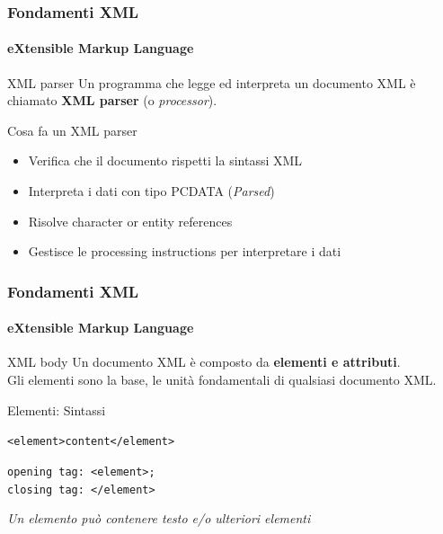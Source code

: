 \begin{frame}
	\frametitle{Fondamenti XML}
	\framesubtitle{eXtensible Markup Language}
	\addtocounter{nframe}{1}

	\begin{block}{XML parser}
		Un programma che legge ed interpreta un documento XML è chiamato \textbf{XML parser} (o \textit{processor}).
	\end{block}
	\begin{block}{Cosa fa un XML parser}
		\begin{itemize}
			\item Verifica che il documento rispetti la sintassi XML
			\item Interpreta i dati con tipo PCDATA (\textit{Parsed})
			\item Risolve character or entity references
			\item Gestisce le processing instructions per interpretare i dati
		\end{itemize}
	\end{block}

\end{frame}





\begin{frame}
    \frametitle{Fondamenti XML}
    \framesubtitle{eXtensible Markup Language}
    \addtocounter{nframe}{1}

	\begin{block}{XML body}
		Un documento XML è composto da \textbf{elementi e attributi}. 
	   \\ Gli elementi sono la base, le unità fondamentali di qualsiasi documento XML.
    \end{block}

    \begin{block}{Elementi: Sintassi}
    \begin{center}\texttt{<element>content</element>}\end{center}
    \begin{center}\texttt{opening tag: <element>;\\ closing tag: </element>}\end{center}
	\end{block}
	\begin{tiny}
		\textit{Un elemento può contenere testo e/o ulteriori elementi}
	\end{tiny}
	
\end{frame}

